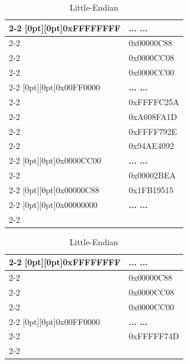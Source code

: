 \documentclass[addpoints, 12pt, answers]{exam}
\begin{document}
\begin{questions}
\begin{parts}
\begin{table}[h]
\vspace{1em}
\renewcommand{\arraystretch}{1.5}
\begin{minipage}[t]{0.5\textwidth}
\centering
\begin{tabular}{l|l|}
\cline{2-2}
\raisebox{2ex}[0pt][0pt]{0xFFFFFFFF}  &{\bf... ...}\\ \cline{2-2}
                                      & 0x00000C88 \\ \cline{2-2}
                                      & 0x0000CC08 \\ \cline{2-2}
                                      & 0x0000CC00 \\ \cline{2-2}
\raisebox{2ex}[0pt][0pt]{0x00FF0000}  &{\bf... ...}\\ \cline{2-2}
                                      & 0xFFFFC25A \\ \cline{2-2}
                                      & 0xA608FA1D \\ \cline{2-2}
                                      & 0xFFFF792E \\ \cline{2-2}
                                      & 0x94AE4092 \\ \cline{2-2}
\raisebox{2ex}[0pt][0pt]{0x0000CC00}  &{\bf... ...}\\ \cline{2-2}
                                      & 0x00002BEA \\ \cline{2-2}
\raisebox{-2ex}[0pt][0pt]{0x00000C88} & 0x1FB19515 \\ \cline{2-2}
\raisebox{-2ex}[0pt][0pt]{0x00000000} &{\bf... ...}\\ \cline{2-2}
\end{tabular}
\caption*{Little-Endian}
\end{minipage}
\hfill
\begin{minipage}[t]{0.5\textwidth}
\centering
\begin{tabular}{l|l|}
\cline{2-2}
\raisebox{2ex}[0pt][0pt]{0xFFFFFFFF}  &{\bf... ...}\\ \cline{2-2}
                                      & 0x00000C88 \\ \cline{2-2}
                                      & 0x0000CC08 \\ \cline{2-2}
                                      & 0x0000CC00 \\ \cline{2-2}
\raisebox{2ex}[0pt][0pt]{0x00FF0000}  &{\bf... ...}\\ \cline{2-2}
                                      & 0xFFFFF74D \\ \cline{2-2}

\end{tabular}
\end{minipage}
\end{table}
\end{parts}
\end{questions}
\end{document}
